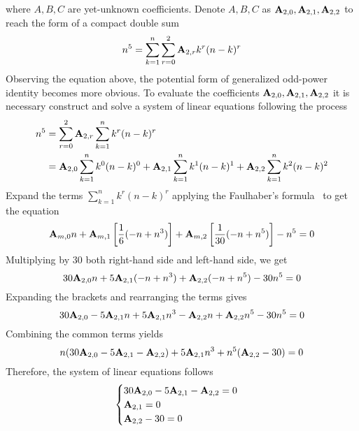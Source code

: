 where $A,B,C$ are yet-unknown coefficients.
Denote $A,B,C$ as ${\mathbf{A}} \sb{2,0}, {\mathbf{A}} \sb{2,1}, {\mathbf{A}} \sb{2,2}$
to reach the form of a compact double sum
\begin{equation*}
    n^5 = \sum_{k=1}^{n} \sum_{r=0}^{2} {\mathbf{A}} \sb{2,r} k^r (n-k)^r
\end{equation*}
Observing the equation above, the potential form of generalized odd-power identity becomes more obvious.
To evaluate the coefficients ${\mathbf{A}} \sb{2,0}, {\mathbf{A}} \sb{2,1}, {\mathbf{A}} \sb{2,2}$
it is necessary construct and solve a system of linear equations following the process
\begin{equation*}
    \begin{split}
        n^5 &= \sum_{r=0}^{2} {\mathbf{A}} \sb{2,r} \sum_{k=1}^{n} k^r (n-k)^r \\
        &= {\mathbf{A}} \sb{2,0} \sum_{k=1}^{n} k^0 (n-k)^0 + {\mathbf{A}} \sb{2,1} \sum_{k=1}^{n} k^1 (n-k)^1 + {\mathbf{A}} \sb{2,2} \sum_{k=1}^{n} k^2 (n-k)^2
    \end{split}
\end{equation*}
Expand the terms $\sum_{k=1}^{n} k^r (n-k)^r$ applying the
Faulhaber's formula~\cite{beardon1996sums}
to get the equation
\begin{equation*}
    {\mathbf{A}} \sb{m,0} n
    + {\mathbf{A}} \sb{m,1} \left[ \frac{1}{6} (-n + n^3) \right]
    + {\mathbf{A}} \sb{m,2} \left[ \frac{1}{30} (-n + n^5) \right] - n^5 = 0
\end{equation*}
Multiplying by $30$ both right-hand side and left-hand side, we get
\begin{equation*}
    30 {\mathbf{A}} \sb{2,0} n + 5 {\mathbf{A}} \sb{2,1} (-n + n^3) + {\mathbf{A}} \sb{2,2} (-n + n^5) - 30n^5 = 0
\end{equation*}
Expanding the brackets and rearranging the terms gives
\begin{equation*}
    30 {\mathbf{A}} \sb{2,0} - 5 {\mathbf{A}} \sb{2,1} n + 5 {\mathbf{A}} \sb{2,1} n^3 - {\mathbf{A}} \sb{2,2} n + {\mathbf{A}} \sb{2,2} n^5 - 30n^5 = 0
\end{equation*}
Combining the common terms yields
\begin{equation*}
    n (30 {\mathbf{A}} \sb{2,0} - 5 {\mathbf{A}} \sb{2,1} - {\mathbf{A}} \sb{2,2}) + 5 {\mathbf{A}} \sb{2,1} n^3 + n^5 ({\mathbf{A}} \sb{2,2} - 30) = 0
\end{equation*}
Therefore, the system of linear equations follows
\begin{equation*}
    \begin{cases}
        30 {\mathbf{A}} \sb{2,0} - 5 {\mathbf{A}} \sb{2,1} - {\mathbf{A}} \sb{2,2} = 0 \\
        {\mathbf{A}} \sb{2,1} = 0 \\
        {\mathbf{A}} \sb{2,2} - 30 = 0
    \end{cases}
\end{equation*}
